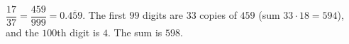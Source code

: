 $\dfrac{17}{37}=\dfrac{459}{999}=0.\overline{459}$. The first $99$ digits are $33$ copies of $459$ (sum $33\cdot18=594$), and the $100$th digit is $4$. The sum is $\boxed{598}$.
